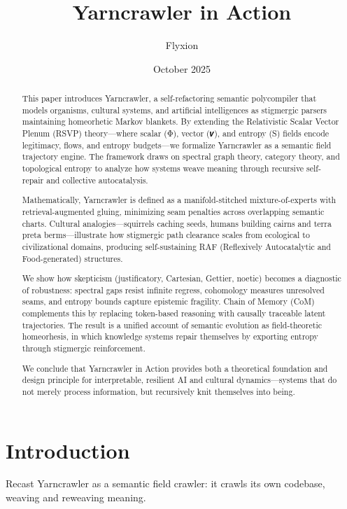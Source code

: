 \documentclass{article}
\title{Yarncrawler in Action}
\author{Flyxion}
\date{October 2025}
\begin{document}
\maketitle

\begin{abstract}
This paper introduces Yarncrawler, a self-refactoring semantic polycompiler that models organisms, cultural systems, and artificial intelligences as stigmergic parsers maintaining homeorhetic Markov blankets. By extending the Relativistic Scalar Vector Plenum (RSVP) theory—where scalar (Φ), vector (𝒗), and entropy (S) fields encode legitimacy, flows, and entropy budgets—we formalize Yarncrawler as a semantic field trajectory engine. The framework draws on spectral graph theory, category theory, and topological entropy to analyze how systems weave meaning through recursive self-repair and collective autocatalysis.

Mathematically, Yarncrawler is defined as a manifold-stitched mixture-of-experts with retrieval-augmented gluing, minimizing seam penalties across overlapping semantic charts. Cultural analogies—squirrels caching seeds, humans building cairns and terra preta berms—illustrate how stigmergic path clearance scales from ecological to civilizational domains, producing self-sustaining RAF (Reflexively Autocatalytic and Food-generated) structures.

We show how skepticism (justificatory, Cartesian, Gettier, noetic) becomes a diagnostic of robustness: spectral gaps resist infinite regress, cohomology measures unresolved seams, and entropy bounds capture epistemic fragility. Chain of Memory (CoM) complements this by replacing token-based reasoning with causally traceable latent trajectories. The result is a unified account of semantic evolution as field-theoretic homeorhesis, in which knowledge systems repair themselves by exporting entropy through stigmergic reinforcement.

We conclude that Yarncrawler in Action provides both a theoretical foundation and design principle for interpretable, resilient AI and cultural dynamics—systems that do not merely process information, but recursively knit themselves into being.
\end{abstract}

\section{Introduction}

Recast Yarncrawler as a semantic field crawler: it crawls its own codebase, weaving and reweaving meaning.
\end{document}
